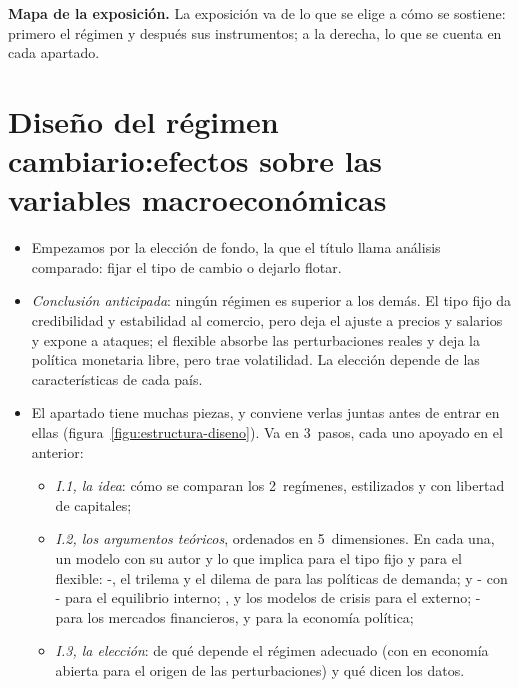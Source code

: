 \documentclass[11pt]{article}
\begin{document}
\begin{anotaciones}
\textbf{Mapa de la exposición.} La exposición va de lo que se elige a cómo se sostiene: primero el régimen y después sus instrumentos; a la derecha, lo que se cuenta en cada apartado.
\begin{infografiacaja}
\caption{Mapa del tema: la pregunta de cada bloque, sus apartados y el hilo que los une}\label{figu:mapa-tema}
\end{infografiacaja}
\end{anotaciones}



\section{Diseño del régimen cambiario:\cortetitulo efectos sobre las variables macroeconómicas}\label{sec:diseno}

\begin{itemize}
\item Empezamos por la elección de fondo, la que el título llama análisis comparado: fijar el tipo de cambio o dejarlo flotar.
\item \emph{Conclusión anticipada}: ningún régimen es superior a los demás. El tipo fijo da credibilidad y estabilidad al comercio, pero deja el ajuste a precios y salarios y expone a ataques; el flexible absorbe las perturbaciones reales y deja la política monetaria libre, pero trae volatilidad. La elección depende de las características de cada país.
\item El apartado tiene muchas piezas, y conviene verlas juntas antes de entrar en ellas (figura~\ref{figu:estructura-diseno}). Va en 3~pasos, cada uno apoyado en el anterior:
  \begin{itemize}
  \item \emph{I.1, la idea}: cómo se comparan los 2~regímenes, estilizados y con libertad de capitales;
  \item \emph{I.2, los argumentos teóricos}, ordenados en 5~dimensiones. En cada una, un modelo con su autor y lo que implica para el tipo fijo y para el flexible: -, el trilema y el dilema de  para las políticas de demanda;  y - con - para el equilibrio interno; ,  y los modelos de crisis para el externo; - para los mercados financieros, y  para la economía política;
  \item \emph{I.3, la elección}: de qué depende el régimen adecuado (con  en economía abierta para el origen de las perturbaciones) y qué dicen los datos.
  \end{itemize}
\end{itemize}
\end{document}
